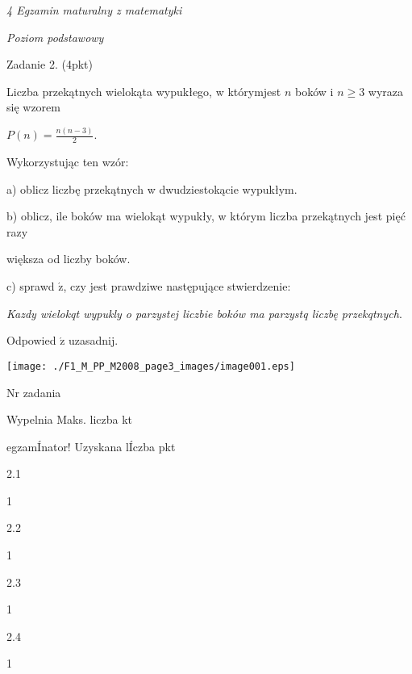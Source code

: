 \documentclass[a4paper,12pt]{article}
\begin{document}
{\it 4 Egzamin maturalny z matematyki}

{\it Poziom podstawowy}

Zadanie 2. (4pkt)

Liczba przekątnych wielokąta wypukłego, w którymjest $n$ boków i $n\geq 3$ wyraza się wzorem

$P(n)=\displaystyle \frac{n(n-3)}{2}.$

Wykorzystując ten wzór:

a) oblicz liczbę przekątnych w dwudziestokącie wypukłym.

b) oblicz, ile boków ma wielokąt wypukły, w którym liczba przekątnych jest pięć razy

większa od liczby boków.

c) sprawd $\acute{\mathrm{z}}$, czy jest prawdziwe następujące stwierdzenie:

{\it Kazdy wielokqt wypukly o parzystej liczbie boków ma parzystq liczbę przekqtnych}.

Odpowied $\acute{\mathrm{z}}$ uzasadnij.
\begin{center}
\texttt{[image: ./F1\_M\_PP\_M2008\_page3\_images/image001.eps]}
\end{center}
Nr zadania

Wypelnia Maks. liczba kt

egzamÍnator! Uzyskana lÍczba pkt

2.1

1

2.2

1

2.3

1

2.4

1
\end{document}
